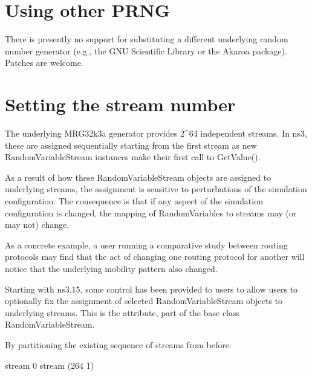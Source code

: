 \documentclass[letterpaper,10pt,english]{sphinxmanual}
\renewcommand{\sphinxcode}[1]{\texttt{\small{#1}}}
\begin{document}
\section{Using other PRNG}
\label{\detokenize{random-variables:using-other-prng}}
There is presently no support for substituting a different underlying
random number generator (e.g., the GNU Scientific Library or the Akaroa
package).  Patches are welcome.


\section{Setting the stream number}
\label{\detokenize{random-variables:setting-the-stream-number}}
The underlying MRG32k3a generator provides 2\textasciicircum{}64 independent streams.
In ns\sphinxhyphen{}3, these are assigned sequentially starting from the first stream as
new RandomVariableStream instances make their first call to GetValue().

As a result of how these RandomVariableStream objects are assigned to
underlying streams, the assignment is sensitive to perturbations of
the simulation configuration.  The consequence is that if any aspect of the
simulation configuration is changed, the mapping of RandomVariables to
streams may (or may not) change.

As a concrete example, a user running a comparative study between routing
protocols may find that the act of changing one routing protocol for another
will notice that the underlying mobility pattern also changed.

Starting with ns\sphinxhyphen{}3.15, some control has been provided to users to allow
users to optionally fix the assignment of selected RandomVariableStream
objects to underlying streams.  This is the \sphinxcode{} attribute, part
of the base class RandomVariableStream.

By partitioning the existing sequence of streams from before:

\begin{sphinxVerbatim}[commandchars=\\\{\}]
\PYGZlt{}\PYGZhy{}\PYGZhy{}\PYGZhy{}\PYGZhy{}\PYGZhy{}\PYGZhy{}\PYGZhy{}\PYGZhy{}\PYGZhy{}\PYGZhy{}\PYGZhy{}\PYGZhy{}\PYGZhy{}\PYGZhy{}\PYGZhy{}\PYGZhy{}\PYGZhy{}\PYGZhy{}\PYGZhy{}\PYGZhy{}\PYGZhy{}\PYGZhy{}\PYGZhy{}\PYGZhy{}\PYGZhy{}\PYGZhy{}\PYGZhy{}\PYGZhy{}\PYGZhy{}\PYGZhy{}\PYGZhy{}\PYGZhy{}\PYGZhy{}\PYGZhy{}\PYGZhy{}\PYGZhy{}\PYGZhy{}\PYGZhy{}\PYGZhy{}\PYGZhy{}\PYGZhy{}\PYGZhy{}\PYGZhy{}\PYGZhy{}\PYGZhy{}\PYGZhy{}\PYGZhy{}\PYGZhy{}\PYGZhy{}\PYGZhy{}\PYGZhy{}\PYGZhy{}\PYGZhy{}\PYGZhy{}\PYGZhy{}\PYGZhy{}\PYGZhy{}\PYGZhy{}\PYGZhy{}\PYGZhy{}\PYGZhy{}\PYGZhy{}\PYGZhy{}\PYGZhy{}\PYGZhy{}\PYGZhy{}\PYGZhy{}\PYGZhy{}\PYGZhy{}\PYGZhy{}\PYGZhy{}\PYGZhy{}\PYGZhy{}\PYGZhy{}\PYGZgt{}
stream 0                                                   stream (2\PYGZca{}64 \PYGZhy{} 1)
\end{sphinxVerbatim}
\end{document}
